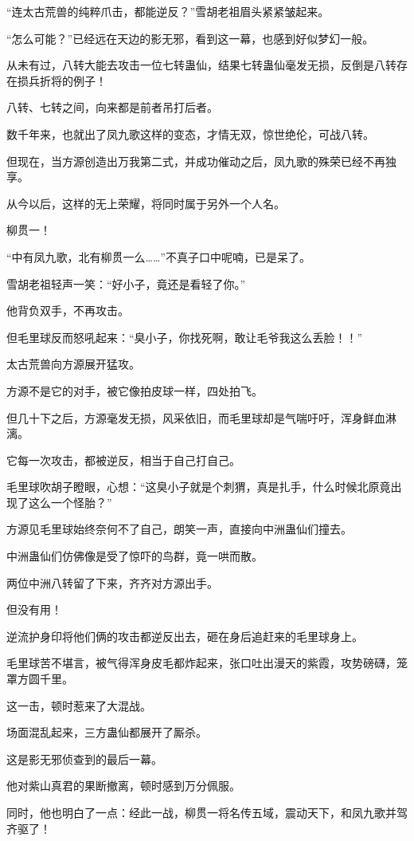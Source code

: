 \begin{this_body}
“连太古荒兽的纯粹爪击，都能逆反？”雪胡老祖眉头紧紧皱起来。

“怎么可能？”已经远在天边的影无邪，看到这一幕，也感到好似梦幻一般。

从未有过，八转大能去攻击一位七转蛊仙，结果七转蛊仙毫发无损，反倒是八转存在损兵折将的例子！

八转、七转之间，向来都是前者吊打后者。

数千年来，也就出了凤九歌这样的变态，才情无双，惊世绝伦，可战八转。

但现在，当方源创造出万我第二式，并成功催动之后，凤九歌的殊荣已经不再独享。

从今以后，这样的无上荣耀，将同时属于另外一个人名。

柳贯一！

“中有凤九歌，北有柳贯一么……”不真子口中呢喃，已是呆了。

雪胡老祖轻声一笑：“好小子，竟还是看轻了你。”

他背负双手，不再攻击。

但毛里球反而怒吼起来：“臭小子，你找死啊，敢让毛爷我这么丢脸！！”

太古荒兽向方源展开猛攻。

方源不是它的对手，被它像拍皮球一样，四处拍飞。

但几十下之后，方源毫发无损，风采依旧，而毛里球却是气喘吁吁，浑身鲜血淋漓。

它每一次攻击，都被逆反，相当于自己打自己。

毛里球吹胡子瞪眼，心想：“这臭小子就是个刺猬，真是扎手，什么时候北原竟出现了这么一个怪胎？”

方源见毛里球始终奈何不了自己，朗笑一声，直接向中洲蛊仙们撞去。

中洲蛊仙们仿佛像是受了惊吓的鸟群，竟一哄而散。

两位中洲八转留了下来，齐齐对方源出手。

但没有用！

逆流护身印将他们俩的攻击都逆反出去，砸在身后追赶来的毛里球身上。

毛里球苦不堪言，被气得浑身皮毛都炸起来，张口吐出漫天的紫霞，攻势磅礴，笼罩方圆千里。

这一击，顿时惹来了大混战。

场面混乱起来，三方蛊仙都展开了厮杀。

这是影无邪侦查到的最后一幕。

他对紫山真君的果断撤离，顿时感到万分佩服。

同时，他也明白了一点：经此一战，柳贯一将名传五域，震动天下，和凤九歌并驾齐驱了！


\end{this_body}
